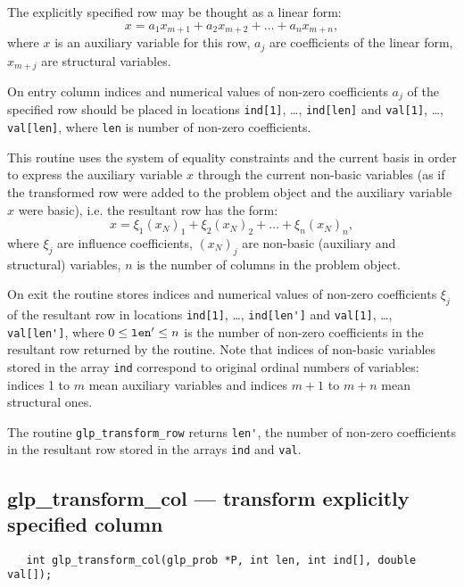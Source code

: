 The explicitly specified row may be thought as a linear form:
$$x=a_1x_{m+1}+a_2x_{m+2}+\dots+a_nx_{m+n},$$
where $x$ is an auxiliary variable for this row, $a_j$ are coefficients
of the linear form, $x_{m+j}$ are structural variables.

On entry column indices and numerical values of non-zero coefficients
$a_j$ of the specified row should be placed in locations \verb|ind[1]|,
\dots, \verb|ind[len]| and \verb|val[1]|, \dots, \verb|val[len]|, where
\verb|len| is number of non-zero coefficients.

This routine uses the system of equality constraints and the current
basis in order to express the auxiliary variable $x$ through the current
non-basic variables (as if the transformed row were added to the problem
object and the auxiliary variable $x$ were basic), i.e. the resultant
row has the form:
$$x=\xi_1(x_N)_1+\xi_2(x_N)_2+\dots+\xi_n(x_N)_n,$$
where $\xi_j$ are influence coefficients, $(x_N)_j$ are non-basic
(auxiliary and structural) variables, $n$ is the number of columns in
the problem object.

On exit the routine stores indices and numerical values of non-zero
coefficients $\xi_j$ of the resultant row in locations \verb|ind[1]|,
\dots, \verb|ind[len']| and \verb|val[1]|, \dots, \verb|val[len']|,
where $0\leq{\tt len'}\leq n$ is the number of non-zero coefficients in
the resultant row returned by the routine. Note that indices of
non-basic variables stored in the array \verb|ind| correspond to
original ordinal numbers of variables: indices 1 to $m$ mean auxiliary
variables and indices $m+1$ to $m+n$ mean structural ones.

\returns

The routine \verb|glp_transform_row| returns \verb|len'|, the number of
non-zero coefficients in the resultant row stored in the arrays
\verb|ind| and \verb|val|.

\newpage

\subsection{glp\_transform\_col --- transform explicitly specified
column}

\synopsis

\begin{verbatim}
   int glp_transform_col(glp_prob *P, int len, int ind[], double val[]);
\end{verbatim}

\description

